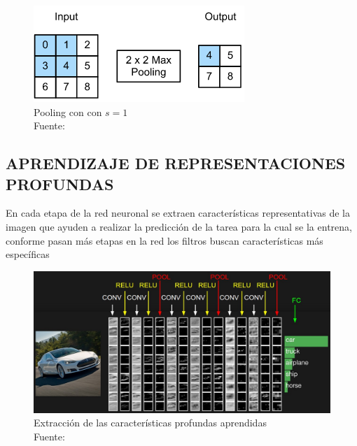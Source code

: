         \begin{figure}[H]
            \centering
            \includegraphics[scale=0.6]{imagenes/pooling}
            \caption{Pooling con con $s=1$\\ Fuente: \citep{zhang2020dive}}
        \end{figure}
    \subsection{APRENDIZAJE DE REPRESENTACIONES PROFUNDAS}
    En cada etapa de la red neuronal se extraen características representativas de la imagen que ayuden a realizar la predicción de la tarea para la cual se la entrena, conforme pasan más etapas en la red los filtros buscan características más específicas \citep{Goodfellow-et-al-2016}
    
    \begin{figure}[H]
            \centering
            \includegraphics[scale=0.3]{imagenes/convnet}
            \caption{Extracción de las características profundas aprendidas\\ Fuente: \citep{stanford_2020}}
        \end{figure}
    
